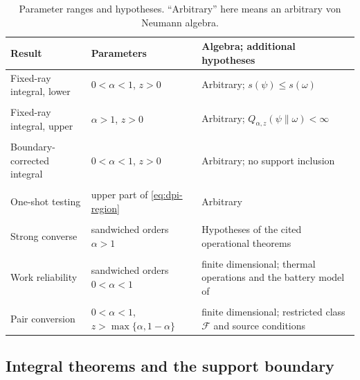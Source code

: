 \documentclass[12pt]{article}
\numberwithin{equation}{section}
\theoremstyle{definition}
\theoremstyle{remark}
\newcommand{\?}{\overset{?}{=}}
\begin{document}
\begin{table}[ht]
\centering
\small
\begin{tabular}{L{0.23\textwidth}L{0.29\textwidth}L{0.31\textwidth}}
\hline
Result & Parameters & Algebra;  additional hypotheses \\
\hline
Fixed-ray integral, lower
& $0<\alpha<1$, $z>0$
& Arbitrary; $s(\psi)\leq s(\omega)$ \\
&&\\
Fixed-ray integral, upper
& $\alpha>1$, $z>0$
& Arbitrary; $Q_{\alpha,z}(\psi\|\omega)<\infty$ \\
&&\\
Boundary-corrected integral
& $0<\alpha<1$, $z>0$
& Arbitrary; no support inclusion \\
&&\\
One-shot testing
& upper part of \eqref{eq:dpi-region}
& Arbitrary \\
&&\\
Strong converse
& sandwiched orders $\alpha>1$
& Hypotheses of the cited operational theorems \\
&&\\
Work reliability
& sandwiched orders $0<\alpha<1$
& finite dimensional; thermal operations and the battery model of
  \cite{Watanabe:2026pzw} \\
&&\\
Pair conversion
& $0<\alpha<1$, $z>\max\{\alpha,1-\alpha\}$
& finite dimensional; restricted class $\mathcal F$ and source conditions \\
\hline
\end{tabular}
\caption{Parameter ranges and hypotheses. ``Arbitrary'' here means an arbitrary
von Neumann algebra.}
\label{tab:scope}
\end{table}

\subsection{Integral theorems and the support boundary}
\end{document}
